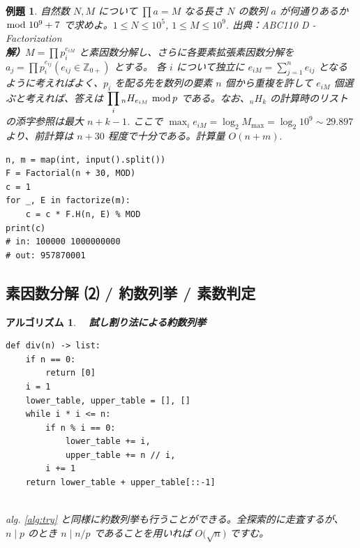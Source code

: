\documentclass[12pt, a4j]{ltjsarticle}
\newtheorem{alg}[thm]{アルゴリズム}
\newtheorem{exm}[thm]{例題}
\begin{document}
\vspace{1cm}

\begin{exm}
自然数 $N, M$ について $\prod a=M$ なる長さ $N$ の数列 $a$ が何通りあるか $\hspace{-2mm}\mod 10^9+7$ で求めよ。$1\le N \le 10^5$, $1\le M \le 10^9$. \hspace{\fill} 出典：\upshape ABC110 D - Factorization\\
{\bf 解）}$M=\displaystyle\prod p_i^{e_{iM}}$ と素因数分解し、さらに各要素拡張素因数分解を $a_j=\displaystyle\prod p_i^{e_{ij}}(e_{ij}\in\mathbb{Z}_{0+})$ とする。 各 $i$ について独立に $e_{iM}=\displaystyle\sum_{j=1}^n e_{ij}$
となるように考えればよく、$p_i$ を配る先を数列の要素 $n$ 個から重複を許して $e_{iM}$ 個選ぶと考えれば、答えは $\displaystyle\prod_i {}_nH_{e_{iM}} {\,\,\rm mod\,} p$ である。なお、${}_nH_k$ の計算時のリストの添字参照は最大 $n+k-1$. ここで $\displaystyle\max_i e_{iM} = \log_2 M_{\max} = \log_2 10^9 \sim 29.897$ より、前計算は $n + 30$ 程度で十分である。計算量 $O(n+m).$\\
\begin{lstlisting}
n, m = map(int, input().split())
F = Factorial(n + 30, MOD)
c = 1
for _, E in factorize(m):
    c = c * F.H(n, E) % MOD
print(c)
# in: 100000 1000000000
# out: 957870001
\end{lstlisting}
\end{exm}

\vspace{1cm}

\subsection{素因数分解 ⑵ / 約数列挙 / 素数判定}

\begin{alg}\upshape　{\bf 試し割り法による約数列挙} \\
\begin{lstlisting}
def div(n) -> list:
    if n == 0:
        return [0]
    i = 1
    lower_table, upper_table = [], []
    while i * i <= n:
        if n % i == 0:
            lower_table += i,
            upper_table += n // i,
        i += 1
    return lower_table + upper_table[::-1]
\end{lstlisting}	\itshape
\quad\\
alg. \ref{alg:try} と同様に約数列挙も行うことができる。全探索的に走査するが、 $n\mid p$ のとき $n \mid n/p$ であることを用いれば $O\bigl(\sqrt{n}\bigr)$ ですむ。
\end{alg}
\end{document}
